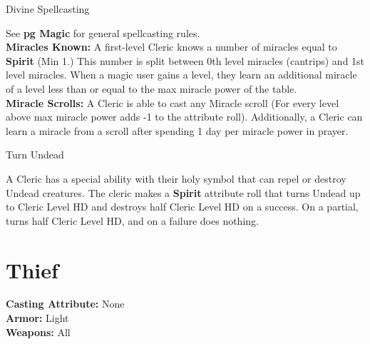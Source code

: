 \documentclass[18pt]{article}
\begin{document}
\begin{multicols}{2}%

\begin{mercHeading}
Divine Spellcasting
\end{mercHeading}

See  \textbf{pg \pageref{section:GenMagicRules} Magic} for general spellcasting rules. \\
\textbf{Miracles Known:} A first-level Cleric knows a number of miracles equal to \textbf{Spirit} (Min 1.) This number is split between 0th level miracles (cantrips) and 1st level miracles. When a magic user gains a level, they learn an additional miracle of a level less than or equal to the max miracle power of the table. \vspace{2pt}\\ 
\textbf{Miracle Scrolls:}
A Cleric is able to cast any Miracle scroll (For every level above max miracle power adds -1 to the attribute roll). Additionally, a Cleric can learn a miracle from a scroll after spending 1 day per miracle power in prayer.

\begin{mercHeading}
Turn Undead
\end{mercHeading}
A Cleric has a special ability with their holy symbol that can repel or destroy Undead creatures. The cleric makes a \textbf{Spirit} attribute roll that turns Undead up to Cleric Level HD and destroys half Cleric Level HD on a success. On a partial, turns half Cleric Level HD, and on a failure does nothing. \\


\end{multicols}

\section*{Thief}%
\begin{multicols}{3}
\begin{mercClassInfo}
\textbf{Casting Attribute:} None\\
\textbf{Armor:} Light\\
\textbf{Weapons:} All
\end{mercClassInfo}
\end{multicols}
\end{document}
